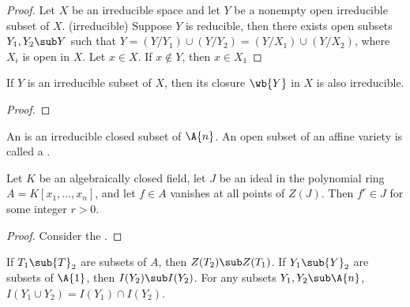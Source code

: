 \documentclass[10pt]{article}
\begin{document}
\begin{proof}
    Let $X$ be an irreducible space and let $Y$ be a nonempty open irreducible subset of $X$. (irreducible) Suppose $Y$ is reducible, then there exists open subsets ${Y}_{1},{Y}_{2}\sub Y$ such that $Y=(Y/{Y}_{1})\cup(Y/{Y}_{2})=(Y/{X}_{1})\cup(Y/{X}_{2})$, where ${X}_{i}$ is open in $X$. Let $x\in X$. If $x\notin Y$, then $x\in{X}_{1}$
\end{proof}




\begin{example}
    If $Y$ is an irreducible subset of $X$, then its closure $\wb{Y}$ in $X$ is also irreducible.
\end{example}
\begin{proof}
    
\end{proof}
\begin{definition}
    An  is an irreducible closed subset of $\A{n}$. An open subset of an affine variety is called a .
\end{definition}
\begin{remark}
    
\end{remark}
\par




\begin{theorem}
    Let $K$ be an algebraically closed field, let $J$ be an ideal in the polynomial ring $A=K[{x}_{1},\dots,{x}_{n}]$, and let $f\in A$ vanishes at all points of $Z(J)$. Then ${f}^{r}\in J$ for some integer $r>0$.
\end{theorem}
\begin{proof}
    Consider the . 
\end{proof}








\begin{proposition}
    If ${T}_{1}\sub{T}_{2}$ are subsets of $A$, then $Z({T}_{2})\sub Z({T}_{1})$. If ${Y}_{1}\sub{Y}_{2}$ are subsets of $\A{1}$, then $I({Y}_{2})\sub I({Y}_{2})$. For any subsets ${Y}_{1},{Y}_{2}\sub\A{n}$, $I({Y}_{1}\cup{Y}_{2})=I({Y}_{1})\cap I({Y}_{2})$. 
\end{proposition}





\hindex
\end{document}
